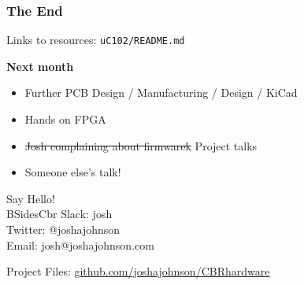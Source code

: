 \documentclass[t]{beamer}
\begin{document}

\begin{frame}
\frametitle{The End}
Links to resources: \texttt{uC102/README.md}
\vspace{5mm}

\textbf{Next month}
\begin{itemize}
	\item Further PCB Design / Manufacturing / Design / KiCad
	\item Hands on FPGA
	\item \sout{Josh complaining about firmwarek} Project talks 
	\item Someone else's talk!
\end{itemize}

\vspace{5mm}
Say Hello! \\
BSidesCbr Slack: josh\\
Twitter:  @\textunderscore joshajohnson\\
Email: josh@joshajohnson.com\\
\vspace{4mm}

Project Files: \url{github.com/joshajohnson/CBRhardware}\\
\end{frame}
\end{document}
